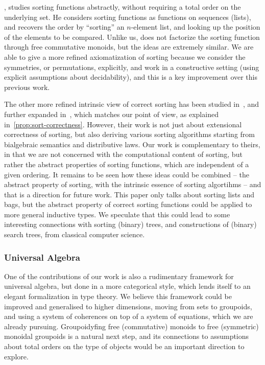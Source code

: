 \cite{hengleinWhatSortingFunction2009}, studies sorting functions abstractly,
without requiring a total order on the underlying set.
%
He considers sorting functions as functions on sequences (lists),
and recovers the order by ``sorting'' an $n$-element list,
and looking up the position of the elements to be compared.
%
Unlike us,
does not factorize the sorting function
through free commutative monoids, but the ideas are extremely similar.
%
We are able to give a more refined axiomatization of sorting because we consider the symmetries, or permutations,
explicitly, and work in a constructive setting (using explicit assumptions about decidability),
and this is a key improvement over this previous work.

The other more refined intrinsic view of correct sorting has been studied in~\cite{hinzeSortingBialgebrasDistributive2012},
and further expanded in~\cite{alexandruIntrinsicallyCorrectSorting2023}, which matches our point of view, as explained
in~\cref{prop:sort-correctness}.
%
However, their work is not just about extensional correctness of sorting, but also deriving various sorting algorithms
starting from bialgebraic semantics and distributive laws.
%
Our work is complementary to theirs, in that we are not concerned with the computational content of sorting, but rather
the abstract properties of sorting functions, which are independent of a given ordering.
%
It remains to be seen how these ideas could be combined -- the abstract property of sorting, with the intrinsic essence
of sorting algortihms -- and that is a direction for future work.
%
This paper only talks about sorting lists and bags, but the abstract property of correct sorting functions could be
applied to more general inductive types. We speculate that this could lead to some interesting connections with sorting
(binary) trees, and constructions of (binary) search trees, from classical computer science.

\subsubsection*{Universal Algebra}

One of the contributions of our work is also a rudimentary framework for universal algebra, but done in a more
categorical style, which lends itself to an elegant formalization in type theory.
%
We believe this framework could be improved and generalised to higher dimensions, moving from sets to groupoids,
and using a system of coherences on top of a system of equations, which we are already pursuing.
%
Groupoidyfing free (commutative) monoids to free (symmetric) monoidal groupoids is a natural next step, and its
connections to assumptions about total orders on the type of objects would be an important direction to explore.


